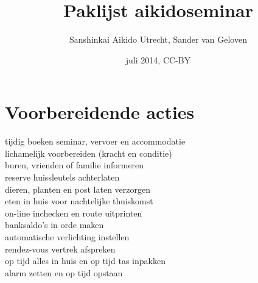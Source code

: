 \documentclass[9pt,twocolumn]{memoir}
\begin{document}
\title{\vspace{-2cm}\Huge\bfseries Paklijst aikidoseminar}
\author{Sanshinkai Aikido Utrecht, Sander van Geloven}
\date{juli 2014, CC-BY}
\maketitle

\section*{Voorbereidende acties}%
tijdig boeken seminar, vervoer en accommodatie\\%
lichamelijk voorbereiden (kracht en conditie)\\%
buren, vrienden of familie informeren\\%
reserve huissleutels achterlaten\\%
dieren, planten en post laten verzorgen\\%
eten in huis voor nachtelijke thuiskomst\\%
on-line inchecken en route uitprinten\\%
banksaldo's in orde maken\\%
automatische verlichting instellen\\%
rendez-vous vertrek afspreken\\%
op tijd alles in huis en op tijd tas inpakken\\%
alarm zetten en op tijd opstaan%
\end{document}
